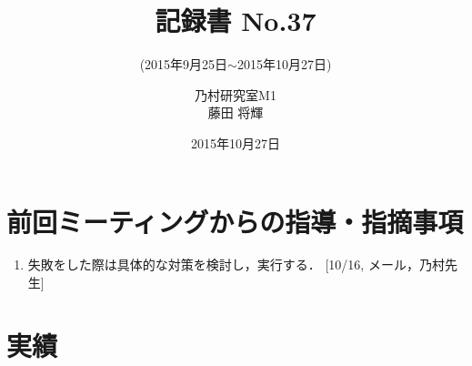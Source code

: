 \documentclass[fleqn, 14pt]{extarticle}
\subtitle{(2015年9月25日$\sim$2015年10月27日)}
\author{乃村研究室M1\\藤田 将輝}
\date{2015年10月27日}
\title{記録書 No.37}
\begin{document}
    \maketitle

    \section{前回ミーティングからの指導・指摘事項}
    \label{sec-1}
    \begin{enumerate}
        \item 失敗をした際は具体的な対策を検討し，実行する．
            \hfill
            [10/16, メール，乃村先生]
            \newline

    \end{enumerate}

    \section{実績}
    \label{sec-2}
\end{document}
